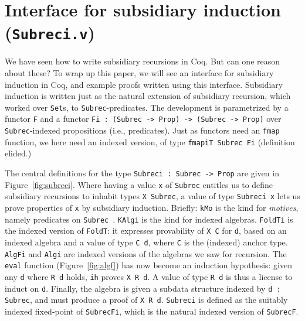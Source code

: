\documentclass[a4paper,USenglish]{lipics-v2021}
\begin{document}
\section{Interface for subsidiary induction (\texttt{Subreci.v})}
\label{sec:interfacei}

We have seen how to write subsidiary recursions in Coq.  But can one
reason about these?  To wrap up this paper, we will see an interface
for subsidiary induction in Coq, and example proofs written using this
interface.  Subsidiary induction is written just as the natural
extension of subsidiary recursion, which worked over \verb|Set|s, to
\verb|Subrec|-predicates.  The development is parametrized by a
functor \verb|F| and a functor
\verb|Fi : (Subrec -> Prop) -> (Subrec -> Prop)| over
\verb|Subrec|-indexed propositions (i.e., predicates).  Just as
functors need an \verb|fmap| function, we here need an indexed
version, of type \verb|fmapiT Subrec Fi| (definition elided.)

The central definitions for the type \verb|Subreci : Subrec -> Prop|
are given in Figure~\ref{fig:subreci}.  Where having a value \verb|x|
of \verb|Subrec| entitles us to define subsidiary recursions to
inhabit types \verb|X Subrec|, a value of type \verb|Subreci x| lets
us prove properties of \verb|x| by subsidiary induction.  Briefly:
\verb|kMo| is the kind for \emph{motives}, namely predicates on
\verb|Subrec|~\cite{mcbride00}.  \verb|KAlgi| is the kind for indexed
algebras.  \verb|FoldTi| is the indexed version of \verb|FoldT|: it 
expresses provability of \verb|X C| for \verb|d|, based on an indexed
algebra and a value of type \verb|C d|, where \verb|C| is the (indexed) anchor
type.  \verb|AlgFi| and \verb|Algi| are indexed versions
of the algebras we saw for recursion.  The \verb|eval| function
(Figure~\ref{fig:algf}) has now become an induction hypothesis: given
any \verb|d| where \verb|R d| holds, \verb|ih| proves \verb|X R d|.  A
value of type \verb|R d| is thus a license to induct on \verb|d|.
Finally, the algebra is given a subdata structure indexed by
\verb|d : Subrec|, and must produce a proof of \verb|X R d|.  \verb|Subreci|
is defined as the suitably indexed fixed-point of \verb|SubrecFi|, which
is the natural indexed version of \verb|SubrecF|.
\end{document}
